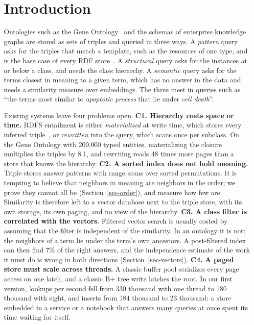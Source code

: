 \section{Introduction}
\label{sec-intro}

Ontologies such as the Gene Ontology~\cite{ashburner2000} and the schemas of
enterprise knowledge graphs are stored as sets of triples and queried in
three ways.
A \emph{pattern} query asks for the triples that match a template, such as
the resources of one type, and is the base case of every RDF
store~\cite{weiss2008,neumann2010}.
A \emph{structural} query asks for the instances at or below a class, and
needs the class hierarchy.
A \emph{semantic} query asks for the terms closest in meaning to a given
term, which has no answer in the data and needs a similarity measure over
embeddings.
The three meet in queries such as ``the terms most similar to
\emph{apoptotic process} that lie under \emph{cell death}''.

Existing systems leave four problems open.
\textbf{C1. Hierarchy costs space or time.}
RDFS entailment is either \emph{materialized} at write time, which stores
every inferred triple~\cite{rdfox}, or \emph{rewritten} into the query,
which scans once per subclass.
On the Gene Ontology with 200,000 typed entities, materializing the closure
multiplies the triples by 8.1, and rewriting reads 48 times more pages than
a store that knows the hierarchy.
\textbf{C2. A sorted index does not hold meaning.}
Triple stores answer patterns with range scans over sorted permutations.
It is tempting to believe that neighbors in meaning are neighbors in the
order; we prove they cannot all be (Section~\ref{sec-order}), and measure how
few are.
Similarity is therefore left to a vector database next to the triple store,
with its own storage, its own paging, and no view of the hierarchy.
\textbf{C3. A class filter is correlated with the vectors.}
Filtered vector search is usually costed by assuming that the filter is
independent of the similarity.
In an ontology it is not: the neighbors of a term lie under the term's own
ancestors.
A post-filtered index can then find 7\% of the right answers, and the
independence estimate of the work it must do is wrong in both directions
(Section~\ref{sec-vectors}).
\textbf{C4. A paged store must scale across threads.}
A classic buffer pool serializes every page access on one latch, and a
classic B+ tree write latches the root.
In our first version, lookups per second fell from 330 thousand with one
thread to 180 thousand with eight, and inserts from 184 thousand to 23
thousand: a store embedded in a service or a notebook that answers many
queries at once spent its time waiting for itself.

